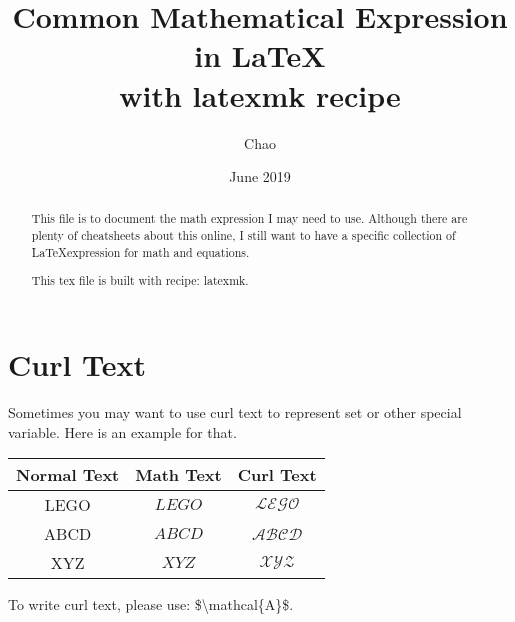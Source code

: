 \documentclass{article}
\title{Common Mathematical Expression \\
\large in \LaTeX \\
with latexmk recipe}
\author{Chao}
\date{June 2019}
\begin{document}
\maketitle
\begin{abstract}
This file is to document the math expression I may need to use.
Although there are plenty of cheatsheets about this online, I still 
want to have a specific collection of \LaTeX expression for math and 
equations.


This tex file is built with recipe: latexmk.
\end{abstract}
\section{Curl Text}
Sometimes you may want to use curl text to represent set or 
other special variable. 
Here is an example for that.

\begin{center}
    \begin{tabular}{|c|c|c|}
        \hline
        Normal Text & Math Text & Curl Text \\
        \hline
        LEGO & $LEGO$ & $\mathcal{LEGO}$ \\
        \hline
        ABCD & $ABCD$ & $\mathcal{ABCD}$ \\
        \hline
        XYZ & $XYZ$ & $\mathcal{XYZ}$ \\
        \hline
    \end{tabular}
\end{center}

To write curl text, please use: \$\textbackslash mathcal\{A\}\$. 
\end{document}
